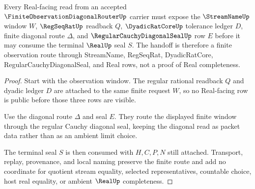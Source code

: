 \begin{theorem}
\label{thm:finite-observation-diagonal-router-real-handoff}
Every Real-facing read from an accepted $\FiniteObservationDiagonalRouterUp$ carrier must expose the $\StreamNameUp$ window $W$, $\RegSeqRatUp$ readback $Q$, $\DyadicRatCoreUp$ tolerance ledger $D$, finite diagonal route $\Delta$, and $\RegularCauchyDiagonalSealUp$ row $E$ before it may consume the terminal $\RealUp$ seal $S$. The handoff is therefore a finite observation route through StreamName, RegSeqRat, DyadicRatCore, RegularCauchyDiagonalSeal, and Real rows, not a proof of Real completeness.
\end{theorem}
\begin{proof}
Start with the observation window. The regular rational readback $Q$ and dyadic ledger $D$ are attached to the same finite request $W$, so no Real-facing row is public before those three rows are visible.

Use the diagonal route $\Delta$ and seal $E$. They route the displayed finite window through the regular Cauchy diagonal seal, keeping the diagonal read as packet data rather than as an ambient limit choice.

The terminal seal $S$ is then consumed with $H,C,P,N$ still attached. Transport, replay, provenance, and local naming preserve the finite route and add no coordinate for quotient stream equality, selected representatives, countable choice, host real equality, or ambient $\RealUp$ completeness.
\end{proof}




